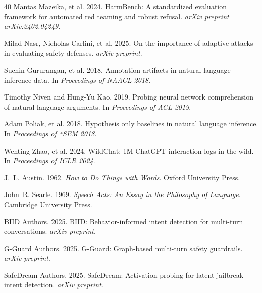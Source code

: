 \documentclass[11pt,a4paper]{article}
\begin{document}
\begin{thebibliography}{40}
Mantas Mazeika, et al. 2024.
\newblock HarmBench: A standardized evaluation framework for automated red teaming and robust refusal.
\newblock \textit{arXiv preprint arXiv:2402.04249}.

Milad Nasr, Nicholas Carlini, et al. 2025.
\newblock On the importance of adaptive attacks in evaluating safety defenses.
\newblock \textit{arXiv preprint}.

Suchin Gururangan, et al. 2018.
\newblock Annotation artifacts in natural language inference data.
\newblock In \textit{Proceedings of NAACL 2018}.

Timothy Niven and Hung-Yu Kao. 2019.
\newblock Probing neural network comprehension of natural language arguments.
\newblock In \textit{Proceedings of ACL 2019}.

Adam Poliak, et al. 2018.
\newblock Hypothesis only baselines in natural language inference.
\newblock In \textit{Proceedings of *SEM 2018}.

Wenting Zhao, et al. 2024.
\newblock WildChat: 1M ChatGPT interaction logs in the wild.
\newblock In \textit{Proceedings of ICLR 2024}.

J.~L. Austin. 1962.
\newblock \textit{How to Do Things with Words}.
\newblock Oxford University Press.

John~R. Searle. 1969.
\newblock \textit{Speech Acts: An Essay in the Philosophy of Language}.
\newblock Cambridge University Press.

BIID Authors. 2025.
\newblock BIID: Behavior-informed intent detection for multi-turn conversations.
\newblock \textit{arXiv preprint}.

G-Guard Authors. 2025.
\newblock G-Guard: Graph-based multi-turn safety guardrails.
\newblock \textit{arXiv preprint}.

SafeDream Authors. 2025.
\newblock SafeDream: Activation probing for latent jailbreak intent detection.
\newblock \textit{arXiv preprint}.

\end{thebibliography}
\end{document}
